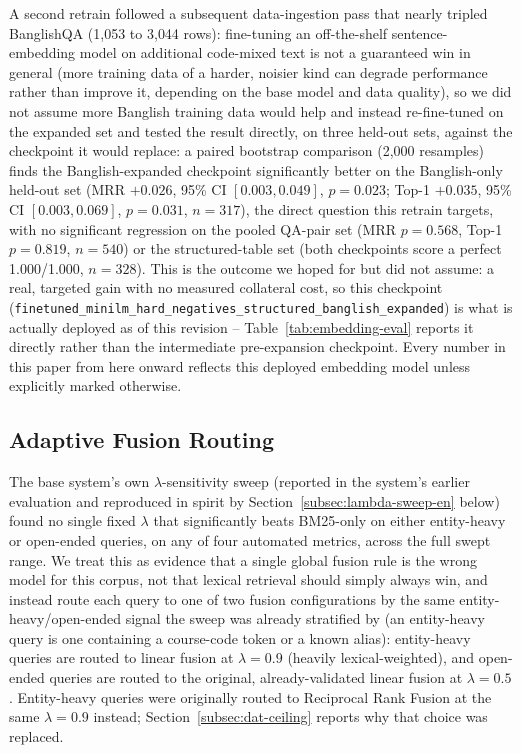 \documentclass[a4paper,twoside]{article}
\begin{document}
A second retrain followed a subsequent data-ingestion pass that nearly tripled BanglishQA (1{,}053 to 3{,}044 rows): fine-tuning an off-the-shelf sentence-embedding model on additional code-mixed text is not a guaranteed win in general (more training data of a harder, noisier kind can degrade performance rather than improve it, depending on the base model and data quality), so we did not assume more Banglish training data would help and instead re-fine-tuned on the expanded set and tested the result directly, on three held-out sets, against the checkpoint it would replace: a paired bootstrap comparison (2,000 resamples) finds the Banglish-expanded checkpoint significantly better on the Banglish-only held-out set (MRR $+0.026$, 95\% CI $[0.003, 0.049]$, $p=0.023$; Top-1 $+0.035$, 95\% CI $[0.003, 0.069]$, $p=0.031$, $n=317$), the direct question this retrain targets, with no significant regression on the pooled QA-pair set (MRR $p=0.568$, Top-1 $p=0.819$, $n=540$) or the structured-table set (both checkpoints score a perfect 1.000/1.000, $n=328$). This is the outcome we hoped for but did not assume: a real, targeted gain with no measured collateral cost, so this checkpoint (\texttt{finetuned\_minilm\_hard\_negatives\_structured\_banglish\_expanded}) is what is actually deployed as of this revision -- Table~\ref{tab:embedding-eval} reports it directly rather than the intermediate pre-expansion checkpoint. Every number in this paper from here onward reflects this deployed embedding model unless explicitly marked otherwise.

\subsection{Adaptive Fusion Routing}
\label{subsec:routing}

The base system's own $\lambda$-sensitivity sweep (reported in the system's earlier evaluation and reproduced in spirit by Section~\ref{subsec:lambda-sweep-en} below) found no single fixed $\lambda$ that significantly beats BM25-only on either entity-heavy or open-ended queries, on any of four automated metrics, across the full swept range. We treat this as evidence that a single global fusion rule is the wrong model for this corpus, not that lexical retrieval should simply always win, and instead route each query to one of two fusion configurations by the same entity-heavy/open-ended signal the sweep was already stratified by (an entity-heavy query is one containing a course-code token or a known alias): entity-heavy queries are routed to linear fusion at $\lambda=0.9$ (heavily lexical-weighted), and open-ended queries are routed to the original, already-validated linear fusion at $\lambda=0.5$. Entity-heavy queries were originally routed to Reciprocal Rank Fusion at the same $\lambda=0.9$ instead; Section~\ref{subsec:dat-ceiling} reports why that choice was replaced.
\end{document}
